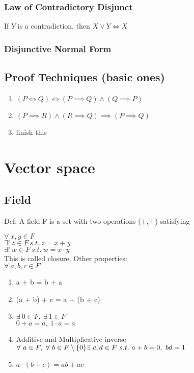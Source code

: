 \documentclass[a4paper]{article}
\begin{document}
\subsubsection{Law of Contradictory Disjunct}
If $Y$ is a contradiction, then $X \lor Y \Leftrightarrow X$

\subsubsection{Disjunctive Normal Form}





\subsection{Proof Techniques (basic ones)}

\begin{enumerate}[i]
	\item $(P \Leftrightarrow Q) \Leftrightarrow (P \implies Q) \land (Q \implies P)$ 
	\item $(P \implies R) \land (R \implies Q) \implies (P \implies Q)$
	\item finish this
\end{enumerate}



\section{Vector space}
\subsection{Field}
Def: A field F is a set with two operations (+, $\cdot$ ) satisfying

\noindent $\forall\ x,y \in F$\\
\-\hspace{1in}$\exists !\ z \in F\ s.t.\ z = x + y$\\
\-\hspace{1in}$\exists !\ w \in F\ s.t.\ w = x \cdot y$\\ 
This is called closure.
\noindent Other properties:\\
$\forall\ a,b,c \in F$
\begin{enumerate}
	\item{a + b = b + a}
	\item{(a + b) + c = a + (b + c)}
	\item{$\exists \ 0 \in F,\ \exists \ 1 \in F$}\\
		$0 + a = a,\ 1 \cdot a = a$ 
	\item{Additive and Multiplicative inverse \\ $\forall \ a \in F,\ \forall \ b \in F \setminus \{0\} \\ \exists \ c,d \in F \ s.t. \ a + b = 0, \ bd = 1$}
	\item{$a \cdot (b + c) = ab + ac$}
\end{enumerate}
\end{document}
